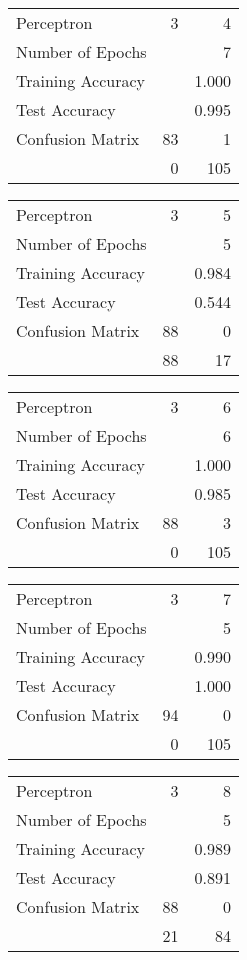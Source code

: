 \documentclass[11pt]{article}
\begin{document}
\begin{minipage}[t]{0.5\textwidth}
\begin{tabular}{|l | r r|}
\hline Perceptron & 3 & 4\\
Number of Epochs & & 7\\
Training Accuracy & & 1.000\\
Test Accuracy & & 0.995\\
Confusion Matrix & 83 & 1\\
 &0 & 105\\ \hline
\end{tabular}
\end{minipage}
\begin{minipage}[t]{0.5\textwidth}
\begin{tabular}{|l | r r|}
\hline Perceptron & 3 & 5\\
Number of Epochs & & 5\\
Training Accuracy & & 0.984\\
Test Accuracy & & 0.544\\
Confusion Matrix & 88 & 0\\
 &88 & 17\\ \hline
\end{tabular}
\end{minipage}
\begin{minipage}[t]{0.5\textwidth}
\begin{tabular}{|l | r r|}
\hline Perceptron & 3 & 6\\
Number of Epochs & & 6\\
Training Accuracy & & 1.000\\
Test Accuracy & & 0.985\\
Confusion Matrix & 88 & 3\\
 &0 & 105\\ \hline
\end{tabular}
\end{minipage}
\begin{minipage}[t]{0.5\textwidth}
\begin{tabular}{|l | r r|}
\hline Perceptron & 3 & 7\\
Number of Epochs & & 5\\
Training Accuracy & & 0.990\\
Test Accuracy & & 1.000\\
Confusion Matrix & 94 & 0\\
 &0 & 105\\ \hline
\end{tabular}
\end{minipage}
\begin{minipage}[t]{0.5\textwidth}
\begin{tabular}{|l | r r|}
\hline Perceptron & 3 & 8\\
Number of Epochs & & 5\\
Training Accuracy & & 0.989\\
Test Accuracy & & 0.891\\
Confusion Matrix & 88 & 0\\
 &21 & 84\\ \hline
\end{tabular}
\end{minipage}
\end{document}
